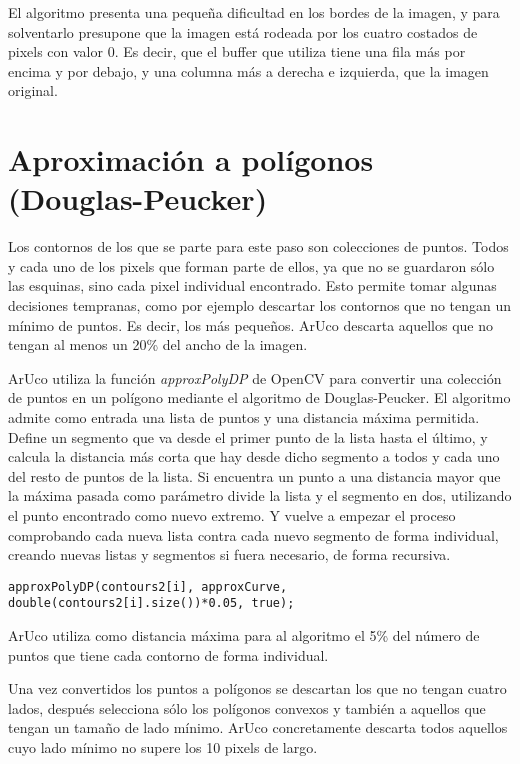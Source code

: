 \documentclass[10pt,a4paper]{article}
\begin{document}
El algoritmo presenta una pequeña dificultad en los bordes de la imagen, y para solventarlo presupone que la imagen está rodeada por los cuatro costados de pixels con valor 0. Es decir, que el buffer que utiliza tiene una fila más por encima y por debajo, y una columna más a derecha e izquierda, que la imagen original.

\section{Aproximación a polígonos (Douglas-Peucker)}
Los contornos de los que se parte para este paso son colecciones de puntos. Todos y cada uno de los pixels que forman parte de ellos, ya que no se guardaron sólo las esquinas, sino cada pixel individual encontrado. Esto permite tomar algunas decisiones tempranas, como por ejemplo descartar los contornos que no tengan un mínimo de puntos. Es decir, los más pequeños. ArUco descarta aquellos que no tengan al menos un 20\% del ancho de la imagen. 

ArUco utiliza la función \textit{approxPolyDP} de OpenCV para convertir una colección de puntos en un polígono mediante el algoritmo de Douglas-Peucker. El algoritmo admite como entrada una lista de puntos y una distancia máxima permitida. Define un segmento que va desde el primer punto de la lista hasta el último, y calcula la distancia más corta que hay desde dicho segmento a todos y cada uno del resto de puntos de la lista. Si encuentra un punto a una distancia mayor que la máxima pasada como parámetro divide la lista y el segmento en dos, utilizando el punto encontrado como nuevo extremo. Y vuelve a empezar el proceso comprobando cada nueva lista contra cada nuevo segmento de forma individual, creando nuevas listas y segmentos si fuera necesario, de forma recursiva.

\begin{lstlisting}[style=C++]
approxPolyDP(contours2[i], approxCurve, double(contours2[i].size())*0.05, true);
\end{lstlisting} 
 
ArUco utiliza como distancia máxima para al algoritmo el 5\% del número de puntos que tiene cada contorno de forma individual. 

Una vez convertidos los puntos a polígonos se descartan los que no tengan cuatro lados, después selecciona sólo los polígonos convexos y también a aquellos que tengan un tamaño de lado mínimo. ArUco concretamente descarta todos aquellos cuyo lado mínimo no supere los 10 pixels de largo. 
\end{document}
